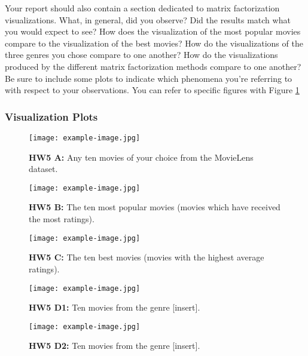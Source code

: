 Your report should also contain a section dedicated to matrix factorization visualizations. What, in general, did you observe? Did the results match what you would expect to see? How does the visualization of the most popular movies compare to the visualization of the best movies? How do the visualizations of the three genres you chose compare to one another? How do the visualizations produced by the different matrix factorization methods compare to one another? Be sure to include some plots to indicate which phenomena you’re referring to with respect to your observations. You can refer to specific figures with Figure \ref{fig:hw5-vis-a}

\subsubsection{Visualization Plots}

\begin{figure}[!h]
    \centering
    \texttt{[image: example-image.jpg]}
    \caption{\textbf{HW5 A:} Any ten movies of your choice from the MovieLens dataset.}
    \label{fig:hw5-vis-a}
\end{figure}

\begin{figure}[!h]
    \centering
    \texttt{[image: example-image.jpg]}
    \caption{\textbf{HW5 B:} The ten most popular movies (movies which have received the most ratings).}
    \label{fig:hw5-vis-b}
\end{figure}

\begin{figure}[!h]
    \centering
    \texttt{[image: example-image.jpg]}
    \caption{\textbf{HW5 C:} The ten best movies (movies with the highest average ratings).}
    \label{fig:hw5-vis-c}
\end{figure}

\begin{figure}[!h]
    \centering
    \texttt{[image: example-image.jpg]}
    \caption{\textbf{HW5 D1:} Ten movies from the genre [insert].}
    \label{fig:hw5-vis-d1}
\end{figure}

\begin{figure}[!h]
    \centering
    \texttt{[image: example-image.jpg]}
    \caption{\textbf{HW5 D2:} Ten movies from the genre [insert].}
    \label{fig:hw5-vis-d2}
\end{figure}


